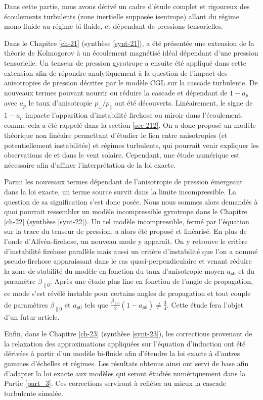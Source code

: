 Dans cette partie, nous avons dérivé un cadre d'étude complet et rigoureux des écoulements turbulents (zone inertielle supposée isentrope) allant du régime mono-fluide au régime bi-fluide, et dépendant de pressions tensorielles. 

Dans le Chapitre \ref{ch-21} (synthèse \ref{synt-21}), a été présentée une extension de la théorie de Kolmogorov à un écoulement magnétisé idéal dépendant d'une pression tensorielle. Un tenseur de pression gyrotrope a ensuite été appliqué dans cette extension afin de répondre analytiquement à la question de l'impact des anisotropies de pression décrites par le modèle \ac{CGL} sur la cascade turbulente. De nouveaux termes pouvant nourrir ou réduire la cascade et dépendant de $1-a_p$ avec $a_p$ le taux d'anisotropie $p_{\perp}/p_{\parallel}$ ont été découverts. Linéairement, le signe de $1-a_p$ impacte l'apparition d'instabilité firehose ou miroir dans l'écoulement, comme cela a été rappelé dans la section \ref{sec-212}. On a donc proposé un modèle théorique non linéaire permettant d'étudier le lien entre anisotropies (et potentiellement instabilités) et régimes turbulents, qui pourrait venir expliquer les observations de \cite{osman_proton_2013} et \cite{hadid_compressible_2018} dans le vent solaire. Cependant, une étude numérique est nécessaire afin d'affiner l'interprétation de la loi exacte. 

Parmi les nouveaux termes dépendant de l'anisotropie de pression émergeant dans la loi exacte, un terme source survit dans la limite incompressible. La question de sa signification s'est donc posée. Nous nous sommes alors demandés à quoi pourrait ressembler un modèle incompressible gyrotrope dans le Chapitre \ref{ch-22} (synthèse \ref{synt-22}). Un tel modèle incompressible, fermé par l'équation sur la trace du tenseur de pression, a alors été proposé et linéarisé. En plus de l'onde d'Alfvén-firehose, un nouveau mode y apparaît. On y retrouve le critère d'instabilité firehose parallèle mais aussi un critère d'instabilité que l'on a nommé pseudo-firehose apparaissant dans le cas quasi-perpendiculaire et venant réduire la zone de stabilité du modèle en fonction du taux d'anisotropie moyen $a_{p0}$ et du paramètre $\beta_{\parallel 0}$. Après une étude plus fine en fonction de l'angle de propagation, ce mode s'est révélé instable pour certains angles de propagation et tout couple de paramètres $\beta_{\parallel 0}$ et $a_{p0}$ tels que $\frac{\beta_{\parallel 0}}{2}\left(1-a_{p0}\right) \neq \frac{3}{4}$. 
Cette étude fera l'objet d'un futur article. 

Enfin, dans le Chapitre \ref{ch-23} (synthèse \ref{synt-23}), les corrections provenant de la relaxation des approximations appliquées sur l'équation d'induction ont été dérivées à partir d'un modèle bi-fluide afin d'étendre la loi exacte à d'autres gammes d'échelles et régimes. Les résultats obtenus ainsi ont servi de base afin d'adapter la loi exacte  aux modèles qui seront étudiés numériquement dans la Partie \ref{part_3}. Ces corrections serviront à refléter au mieux la cascade turbulente simulée.
